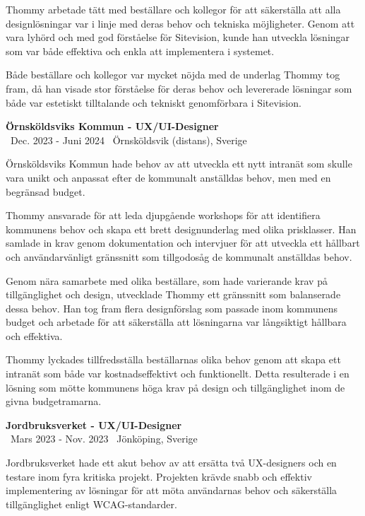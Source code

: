 \documentclass[a4paper,10pt]{article}
\begin{document}
Thommy arbetade tätt med beställare och kollegor för att säkerställa att alla designlösningar var i linje med deras behov och tekniska möjligheter. Genom att vara lyhörd och med god förståelse för Sitevision, kunde han utveckla lösningar som var både effektiva och enkla att implementera i systemet.

Både beställare och kollegor var mycket nöjda med de underlag Thommy tog fram, då han visade stor förståelse för deras behov och levererade lösningar som både var estetiskt tilltalande och tekniskt genomförbara i Sitevision.

\vspace{0.5cm}
\textbf{Örnsköldsviks Kommun - UX/UI-Designer}\\
\normalsize \faCalendar \ Dec. 2023 - Juni 2024 \quad \faMapMarker \ Örnsköldsvik (distans), Sverige

Örnsköldsviks Kommun hade behov av att utveckla ett nytt intranät som skulle vara unikt och anpassat efter de kommunalt anställdas behov, men med en begränsad budget.

Thommy ansvarade för att leda djupgående workshops för att identifiera kommunens behov och skapa ett brett designunderlag med olika prisklasser. Han samlade in krav genom dokumentation och intervjuer för att utveckla ett hållbart och användarvänligt gränssnitt som tillgodosåg de kommunalt anställdas behov.

Genom nära samarbete med olika beställare, som hade varierande krav på tillgänglighet och design, utvecklade Thommy ett gränssnitt som balanserade dessa behov. Han tog fram flera designförslag som passade inom kommunens budget och arbetade för att säkerställa att lösningarna var långsiktigt hållbara och effektiva.

Thommy lyckades tillfredsställa beställarnas olika behov genom att skapa ett intranät som både var kostnadseffektivt och funktionellt. Detta resulterade i en lösning som mötte kommunens höga krav på design och tillgänglighet inom de givna budgetramarna.

\vspace{0.5cm}
\textbf{Jordbruksverket - UX/UI-Designer}\\
\normalsize \faCalendar \ Mars 2023 - Nov. 2023 \quad \faMapMarker \ Jönköping, Sverige

Jordbruksverket hade ett akut behov av att ersätta två UX-designers och en testare inom fyra kritiska projekt. Projekten krävde snabb och effektiv implementering av lösningar för att möta användarnas behov och säkerställa tillgänglighet enligt WCAG-standarder.
\end{document}
